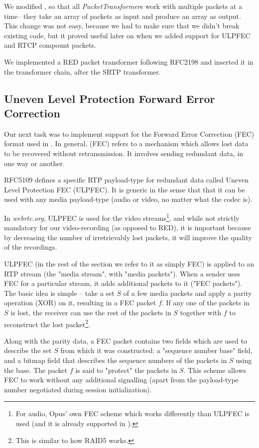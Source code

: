 \documentclass[twoside,openright,a4paper,12pt,english]{article}
\begin{document}
We modified \lj, so that all \emph{PacketTransformer}s work with multiple
packets at a time-- they take an array of packets as input and produce an array
as output. This change was not easy, because we had to make sure that we didn't
break existing code, but it proved useful later on when we added support for
ULPFEC and RTCP compount packets.

We implemented a RED packet transformer following RFC2198 and inserted it in
the transformer chain, after the SRTP transformer.




\subsection{Uneven Level Protection Forward Error Correction}
\label{ulpfec}
Our next task was to implement support for the Forward Error Correction (FEC)
format used in \wrtc.
In general, (FEC) refers to a mechanism which allows
lost data to be recovered without retransmission. It involves sending redundant
data, in one way or another.

RFC5109\cite{ulpfec} defines a specific RTP payload-type for
redundant data called Uneven Level Protection FEC (ULPFEC). It is generic in
the sense that that it can be used with any media payload-type
(audio or video, no matter what the codec is). 

In \emph{webrtc.org},
ULPFEC is used for the video streams\footnote{For audio, Opus' own FEC scheme which works
differently than ULPFEC is used (and it is already supported in \lj).},
and while not strictly mandatory for our video-recording (as opposed to RED),
it is important because by decreasing the number of irretrievably lost packets,
it will improve the quality of the recordings.

ULPFEC (in the rest of the section we refer to it as simply FEC) is applied to
an RTP stream (the "media stream", with "media packets"). When a sender uses FEC
for a particular stream, it adds additional packets to it ("FEC packets"). The basic idea is simple --
take a set $S$ of a few media packets and apply a parity operation (XOR) on it,
resulting in a FEC packet $f$. If any one of the packets in $S$ is lost,
the receiver can use the rest of the packets in $S$ together with $f$ to reconstruct the
lost packet\footnote{This is similar to how RAID5 works.}. 

Along with the parity data, a FEC packet contains two fields which are used to
describe the set $S$ from which it was constructed: a "sequence number base"
field, and a bitmap field that describes the sequence numbers of the packets in
$S$ using the base. The packet $f$ is said to "protect" the packets in $S$. This scheme 
allows FEC to work without any additional
signalling (apart from the payload-type number negotiated during session
initialization). 
\end{document}
